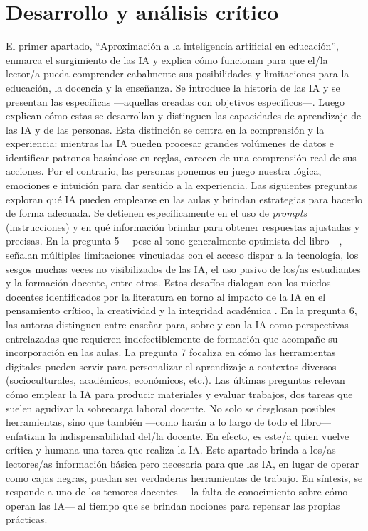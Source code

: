 \documentclass[spanish]{textolivre}
\begin{document}
\section{Desarrollo y análisis crítico}\label{sec-normas}
El primer apartado, “Aproximación a la inteligencia artificial en educación”, enmarca el surgimiento de las IA y explica cómo funcionan para que el/la lector/a pueda comprender cabalmente sus posibilidades y limitaciones para la educación, la docencia y la enseñanza. Se introduce la historia de las IA y se presentan las específicas —aquellas creadas con objetivos específicos—. Luego explican cómo estas se desarrollan y distinguen las capacidades de aprendizaje de las IA y de las personas. Esta distinción se centra en la comprensión y la experiencia: mientras las IA pueden procesar grandes volúmenes de datos e identificar patrones basándose en reglas, carecen de una comprensión real de sus acciones. Por el contrario, las personas ponemos en juego nuestra lógica, emociones e intuición para dar sentido a la experiencia. Las siguientes preguntas exploran qué IA pueden emplearse en las aulas y brindan estrategias para hacerlo de forma adecuada. Se detienen específicamente en el uso de \textit{prompts} (instrucciones) y en qué información brindar para obtener respuestas ajustadas y precisas. En la pregunta 5 —pese al tono generalmente optimista del libro—, señalan múltiples limitaciones vinculadas con el acceso dispar a la tecnología, los sesgos muchas veces no visibilizados de las IA, el uso pasivo de los/as estudiantes y la formación docente, entre otros. Estos desafíos dialogan con los miedos docentes identificados por la literatura en torno al impacto de la IA en el pensamiento crítico, la creatividad y la integridad académica \cite{sartorharada2026professores}. En la pregunta 6, las autoras distinguen entre enseñar para, sobre y con la IA como perspectivas entrelazadas que requieren indefectiblemente de formación que acompañe su incorporación en las aulas. La pregunta 7 focaliza en cómo las herramientas digitales pueden servir para personalizar el aprendizaje a contextos diversos (socioculturales, académicos, económicos, etc.). Las últimas preguntas relevan cómo emplear la IA para producir materiales y evaluar trabajos, dos tareas que suelen agudizar la sobrecarga laboral docente. No solo se desglosan posibles herramientas, sino que también —como harán a lo largo de todo el libro— enfatizan la indispensabilidad del/la docente. En efecto, es este/a quien vuelve crítica y humana una tarea que realiza la IA. Este apartado brinda a los/as lectores/as información básica pero necesaria para que las IA, en lugar de operar como cajas negras, puedan ser verdaderas herramientas de trabajo. En síntesis, se responde a uno de los temores docentes —la falta de conocimiento sobre cómo operan las IA— al tiempo que se brindan nociones para repensar las propias prácticas.
\end{document}
